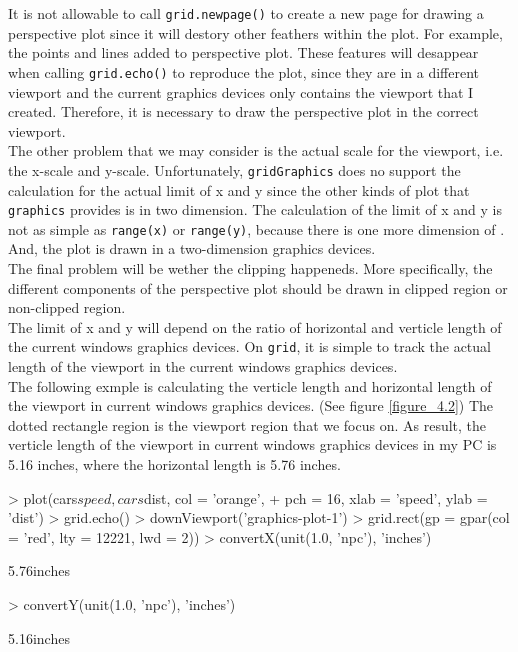 \documentclass[paper=a4, fontsize=11pt]{report}
\begin{document}
It is not allowable to call \texttt{grid.newpage()} to create a new page for drawing a perspective plot since it will destory other feathers within the plot. For example, the points and lines added to perspective plot. These features will desappear when calling \texttt{grid.echo()} to reproduce the plot, since they are in a different viewport and the current graphics devices only contains the viewport that I created. Therefore, it is necessary to draw the perspective plot in the correct viewport.\\

The other problem that we may consider is the actual scale for the viewport, i.e. the x-scale and y-scale. Unfortunately, \texttt{gridGraphics} does no support the calculation for the actual limit of x and y since the other kinds of plot that \texttt{graphics} provides is in two dimension. The calculation of the limit of x and y is not as simple as \texttt{range(x)} or \texttt{range(y)}, because there is one more dimension of . And, the plot is drawn in a two-dimension graphics devices.\\

The final problem will be wether the clipping happeneds. More specifically, the different components of the perspective plot should be drawn in clipped region or non-clipped region. \\

The limit of x and y will depend on the ratio of horizontal and verticle length of the current windows graphics devices. On \texttt{grid}, it is simple to track the actual length of the viewport in the current windows graphics devices. \\

The following exmple is calculating the verticle length and horizontal length of the viewport in current windows graphics devices. (See figure \ref{figure_4.2}) The dotted rectangle region is the viewport region that we focus on. As result, the verticle length of the viewport in current windows graphics devices in my PC is 5.16 inches, where the horizontal length is 5.76 inches. \\


\begin{Schunk}
\begin{Sinput}
> plot(cars$speed, cars$dist, col = 'orange', 
+ pch = 16, xlab = 'speed', ylab = 'dist')
> grid.echo()
> downViewport('graphics-plot-1')
> grid.rect(gp = gpar(col = 'red', lty = 12221, lwd = 2))
> convertX(unit(1.0, 'npc'), 'inches')
\end{Sinput}
\begin{Soutput}
[1] 5.76inches
\end{Soutput}
\begin{Sinput}
> convertY(unit(1.0, 'npc'), 'inches')
\end{Sinput}
\begin{Soutput}
[1] 5.16inches
\end{Soutput}
\end{Schunk}
\end{document}
